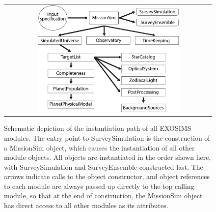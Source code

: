 \documentclass[cleanfoot]{asme2ej}
\begin{document}

\begin{figure}[ht]
    \begin{center}
        \begin{tabular}{c}
             \includegraphics[width=0.7\textwidth]{instantiation_tree1}
        \end{tabular}
    \end{center}
    \caption{Schematic depiction of the instantiation path of all EXOSIMS modules.  The entry point to SurveySimulation is the construction of a MissionSim object, which causes the instantiation of all other module objects.  All objects are instantiated in the order shown here, with SurveySimulation and SurveyEnsemble constructed last.  The arrows indicate calls to the object constructor, and object references to each module are always passed up directly to the top calling module, so that at the end of construction, the MissionSim object has direct access to all other modules as its attributes.}
    \label{fig:instantiation_tree}
\end{figure}
\end{document}
